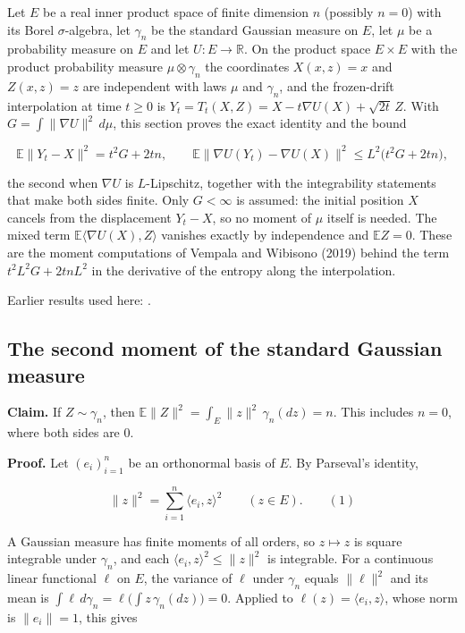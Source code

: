 \documentclass[11pt,a4paper]{report}
\begin{document}
Let \(E\) be a real inner product space of finite dimension \(n\) (possibly \(n=0\)) with its Borel \(\sigma\)-algebra, let \(\gamma_n\) be the standard Gaussian measure on \(E\), let \(\mu\) be a probability measure on \(E\) and let \(U:E\to\mathbb R\). On the product space \(E\times E\) with the product probability measure \(\mu\otimes\gamma_n\) the coordinates \(X(x,z)=x\) and \(Z(x,z)=z\) are independent with laws \(\mu\) and \(\gamma_n\), and the frozen-drift interpolation at time \(t\ge0\) is \(Y_t=T_t(X,Z)=X-t\nabla U(X)+\sqrt{2t}\,Z\). With \(G=\int\|\nabla U\|^2\,d\mu\), this section proves the exact identity and the bound


\[\mathbb E\|Y_t-X\|^2=t^2G+2tn,\qquad \mathbb E\|\nabla U(Y_t)-\nabla U(X)\|^2\le L^2\bigl(t^2G+2tn\bigr),\]


the second when \(\nabla U\) is \(L\)-Lipschitz, together with the integrability statements that make both sides finite. Only \(G<\infty\) is assumed: the initial position \(X\) cancels from the displacement \(Y_t-X\), so no moment of \(\mu\) itself is needed. The mixed term \(\mathbb E\langle\nabla U(X),Z\rangle\) vanishes exactly by independence and \(\mathbb EZ=0\). These are the moment computations of Vempala and Wibisono (2019) behind the term \(t^2L^2G+2tnL^2\) in the derivative of the entropy along the interpolation.



Earlier results used here: \cite[Section~3.36]{LangevinLean2026ULASC}.
\subsection{\texorpdfstring{The second moment of the standard Gaussian measure}{The second moment of the standard Gaussian measure}}
\label{report-step-UnadjustedLangevin-LSI-GaussianDrift-lean-1}


\textbf{Claim.} If \(Z\sim\gamma_n\), then \(\mathbb E\|Z\|^2=\int_E\|z\|^2\,\gamma_n(dz)=n\). This includes \(n=0\), where both sides are \(0\).




\textbf{Proof.} Let \((e_i)_{i=1}^n\) be an orthonormal basis of \(E\). By Parseval's identity,


\[\|z\|^2=\sum_{i=1}^n\langle e_i,z\rangle^2\qquad(z\in E).\qquad(1)\]


A Gaussian measure has finite moments of all orders, so \(z\mapsto z\) is square integrable under \(\gamma_n\), and each \(\langle e_i,z\rangle^2\le\|z\|^2\) is integrable. For a continuous linear functional \(\ell\) on \(E\), the variance of \(\ell\) under \(\gamma_n\) equals \(\|\ell\|^2\) and its mean is \(\int\ell\,d\gamma_n=\ell\bigl(\int z\,\gamma_n(dz)\bigr)=0\). Applied to \(\ell(z)=\langle e_i,z\rangle\), whose norm is \(\|e_i\|=1\), this gives
\end{document}
